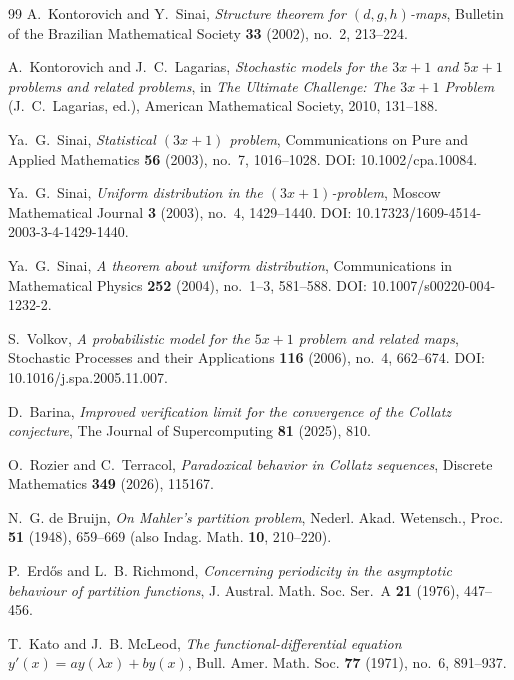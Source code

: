 \documentclass[11pt]{article}
\theoremstyle{definition}
\theoremstyle{remark}
\begin{document}
\begin{thebibliography}{99}
 A.\ Kontorovich and Y.\ Sinai,
  \emph{Structure theorem for $(d,g,h)$-maps}, Bulletin of the
  Brazilian Mathematical Society \textbf{33} (2002), no.\ 2, 213--224.

 A.\ Kontorovich and J.\ C.\ Lagarias,
  \emph{Stochastic models for the $3x+1$ and $5x+1$ problems and
  related problems}, in \emph{The Ultimate Challenge: The $3x+1$
  Problem} (J.\ C.\ Lagarias, ed.), American Mathematical Society,
  2010, 131--188.

 Ya.\ G.\ Sinai, \emph{Statistical $(3x+1)$
  problem}, Communications on Pure and Applied Mathematics \textbf{56}
  (2003), no.\ 7, 1016--1028. DOI: 10.1002/cpa.10084.

 Ya.\ G.\ Sinai, \emph{Uniform distribution in
  the $(3x+1)$-problem}, Moscow Mathematical Journal \textbf{3} (2003),
  no.\ 4, 1429--1440. DOI: 10.17323/1609-4514-2003-3-4-1429-1440.

 Ya.\ G.\ Sinai, \emph{A theorem about uniform
  distribution}, Communications in Mathematical Physics \textbf{252}
  (2004), no.\ 1--3, 581--588. DOI: 10.1007/s00220-004-1232-2.

 S.\ Volkov, \emph{A probabilistic model for the
  $5x+1$ problem and related maps}, Stochastic Processes and their
  Applications \textbf{116} (2006), no.\ 4, 662--674.
  DOI: 10.1016/j.spa.2005.11.007.

 D.\ Barina, \emph{Improved verification limit for
  the convergence of the Collatz conjecture}, The Journal of
  Supercomputing \textbf{81} (2025), 810.

 O.\ Rozier and C.\ Terracol,
  \emph{Paradoxical behavior in Collatz sequences}, Discrete
  Mathematics \textbf{349} (2026), 115167.

N.~G. de Bruijn, \emph{On Mahler's partition problem}, Nederl. Akad. Wetensch., Proc.
\textbf{51} (1948), 659--669 (also Indag. Math. \textbf{10}, 210--220).

P.~Erd\H{o}s and L.~B. Richmond, \emph{Concerning periodicity in the asymptotic behaviour of
partition functions}, J. Austral. Math. Soc. Ser.~A \textbf{21} (1976), 447--456.

T.~Kato and J.~B. McLeod, \emph{The functional-differential equation $y'(x) = ay(\lambda x) +
by(x)$}, Bull. Amer. Math. Soc. \textbf{77} (1971), no.~6, 891--937.


\end{thebibliography}
\end{document}
